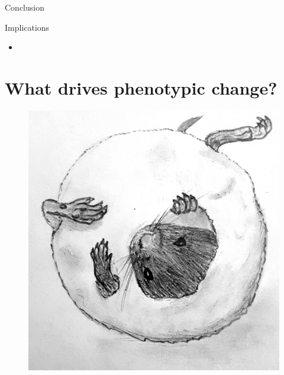 \documentclass[10pt]{beamer}%
\begin{document}
\begin{frame}{Conclusion}
	\begin{block}{Implications}
		\begin{itemize}
			\item 
		\end{itemize}
	\end{block}
\end{frame}



\section{What drives phenotypic change?}




\begin{frame}[plain]{}
	\begin{figure}
	\centering
		\includegraphics[height= \textheight]{Figures/SnowBall}
	\end{figure}
\end{frame}
\end{document}

